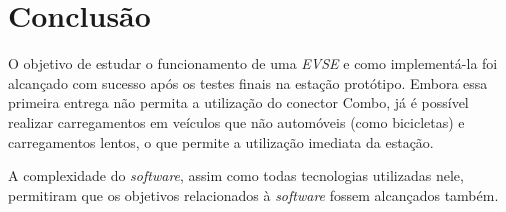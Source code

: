 \chapter{Conclusão}
\label{stateofart:conclusion}

  O objetivo de estudar o funcionamento de uma \textit{\ac{EVSE}} e como implementá-la foi alcançado com sucesso após os testes finais na estação protótipo. Embora essa primeira entrega não permita a utilização do conector Combo, já é possível realizar carregamentos em veículos que não automóveis (como bicicletas) e carregamentos lentos, o que permite a utilização imediata da estação.

  A complexidade do \textit{software}, assim como todas tecnologias utilizadas nele, permitiram que os objetivos relacionados à \textit{software} fossem alcançados também.
  